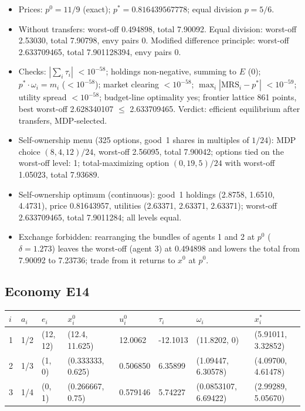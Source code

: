 \begin{itemize}[leftmargin=1.2em,itemsep=0pt,topsep=2pt]\footnotesize
\item Prices: $p^0 = 11/9$ (exact); $p^* = 0.816439567778$; equal division $p = 5/6$.
\item Without transfers: worst-off 0.494898, total 7.90092. Equal division: worst-off 2.53030, total 7.90798, envy pairs 0. Modified difference principle: worst-off 2.633709465, total 7.901128394, envy pairs 0.
\item Checks: $|\sum_i\tau_i|$ $<10^{-58}$; holdings non-negative, summing to $E$ (0); $p^*\cdot\omega_i = m_i$ ($<10^{-58}$); market clearing $<10^{-58}$; $\max_i|\mathrm{MRS}_i - p^*|$ $<10^{-59}$; utility spread $<10^{-58}$; budget-line optimality yes; frontier lattice 861 points, best worst-off 2.628340107 $\leq$ 2.633709465. Verdict: efficient equilibrium after transfers, MDP-selected.
\item Self-ownership menu (325 options, good~1 shares in multiples of $1/24$): MDP choice $(8, 4, 12)/24$, worst-off 2.56095, total 7.90042; options tied on the worst-off level: 1; total-maximizing option $(0, 19, 5)/24$ with worst-off 1.05023, total 7.93689.
\item Self-ownership optimum (continuous): good~1 holdings (2.8758, 1.6510, 4.4731), price 0.81643957, utilities (2.63371, 2.63371, 2.63371); worst-off 2.633709465, total 7.9011284; all levels equal.
\item Exchange forbidden: rearranging the bundles of agents 1 and 2 at $p^0$ ($\delta = 1.273$) leaves the worst-off (agent 3) at 0.494898 and lowers the total from 7.90092 to 7.23736; trade from it returns to $x^0$ at $p^0$.
\end{itemize}

\subsection*{Economy E14}
\label{ec:E14}
{\scriptsize\setlength{\tabcolsep}{3pt}
\begin{tabular}{@{}llllllll@{}}
\toprule
$i$ & $a_i$ & $e_i$ & $x^0_i$ & $u^0_i$ & $\tau_i$ & $\omega_i$ & $x^*_i$ \\
\midrule
1 & 1/2 & (12, 12) & (12.4, 11.625) & 12.0062 & -12.1013 & (11.8202, 0) & (5.91011, 3.32852) \\
2 & 1/3 & (1, 0) & (0.333333, 0.625) & 0.506850 & 6.35899 & (1.09447, 6.30578) & (4.09700, 4.61478) \\
3 & 1/4 & (0, 1) & (0.266667, 0.75) & 0.579146 & 5.74227 & (0.0853107, 6.69422) & (2.99289, 5.05670) \\
\bottomrule\end{tabular}}

